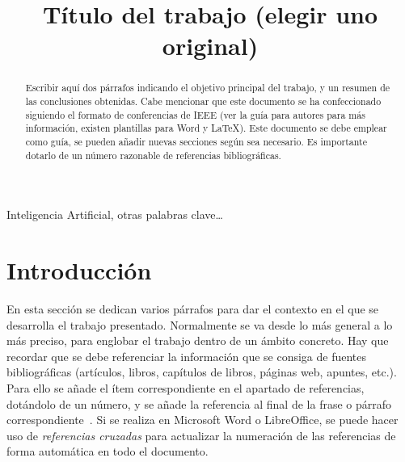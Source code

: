 \documentclass[conference,a4paper]{IEEEtran}
\begin{document}
\title{Título del trabajo (elegir uno original)}

\author{
  
  \and
  
}

\maketitle


\begin{abstract}
  Escribir aquí dos párrafos indicando el objetivo principal del trabajo, y un
  resumen de las conclusiones obtenidas. Cabe mencionar que este documento se
  ha confeccionado siguiendo el formato de conferencias de IEEE (ver la guía
  para autores para más información, existen plantillas para Word y \LaTeX).
  Este documento se debe emplear como guía, se pueden añadir nuevas secciones
  según sea necesario. Es importante dotarlo de un número razonable de
  referencias bibliográficas.
\end{abstract}


\begin{IEEEkeywords}
  Inteligencia Artificial, otras palabras clave…
\end{IEEEkeywords}


\section{Introducción}

En esta sección se dedican varios párrafos para dar el contexto en el que se
desarrolla el trabajo presentado. Normalmente se va desde lo más general a lo
más preciso, para englobar el trabajo dentro de un ámbito concreto. Hay que
recordar que se debe referenciar la información que se consiga de fuentes
bibliográficas (artículos, libros, capítulos de libros, páginas web, apuntes,
etc.). Para ello se añade el ítem correspondiente en el apartado de
referencias, dotándolo de un número, y se añade la referencia al final de la
frase o párrafo correspondiente~\cite{b1}. Si se realiza en Microsoft Word o
LibreOffice, se puede hacer uso de \emph{referencias cruzadas} para actualizar
la numeración de las referencias de forma automática en todo el documento.
\end{document}
